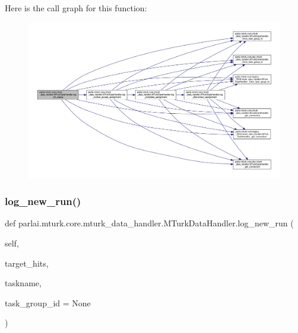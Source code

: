 Here is the call graph for this function\+:
\nopagebreak
\begin{figure}[H]
\begin{center}
\leavevmode
\includegraphics[width=350pt]{classparlai_1_1mturk_1_1core_1_1mturk__data__handler_1_1MTurkDataHandler_acfa910fb6805c19a8693b7688f1fb133_cgraph}
\end{center}
\end{figure}
\mbox{\label{classparlai_1_1mturk_1_1core_1_1mturk__data__handler_1_1MTurkDataHandler_a33facd12d38fa532a28a113b909073a6}} 
\subsubsection{\texorpdfstring{log\+\_\+new\+\_\+run()}{log\_new\_run()}}
{\footnotesize\ttfamily def parlai.\+mturk.\+core.\+mturk\+\_\+data\+\_\+handler.\+M\+Turk\+Data\+Handler.\+log\+\_\+new\+\_\+run (\begin{DoxyParamCaption}\item[{}]{self,  }\item[{}]{target\+\_\+hits,  }\item[{}]{taskname,  }\item[{}]{task\+\_\+group\+\_\+id = {\ttfamily None} }\end{DoxyParamCaption})}

